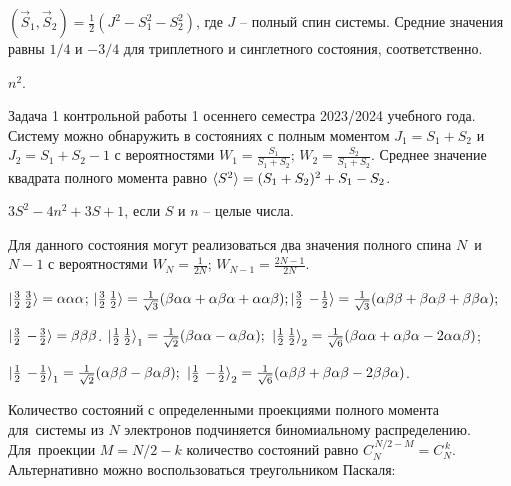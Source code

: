 \par
{} $(\vec{S}_1,\vec{S}_2)=\frac{1}{2}( J^2 - S_1^2-S_2^2)$, где $J$ – полный спин системы. Средние значения равны $1/4$ и $-3/4$ для триплетного и синглетного состояния, соответственно.\par
{} $n^2.$\par
{} Задача 1 контрольной работы 1 осеннего семестра 2023/2024 учебного года. Систему можно обнаружить в состояниях с полным моментом $J_1=S_1+S_2$ и $J_2=S_1+S_2-1$ с вероятностями $W_1=\frac{S_1}{S_1+S_2}$; $W_2=\frac{S_2}{S_1+S_2}$. Среднее значение квадрата полного момента равно $\braket{S^2}=(S_1+S_2 )^2+S_1-S_2$.
\par
{} $3S^2-4n^2+3S+1$, если $S$ и $n$ – целые числа.\par
{} Для данного состояния могут реализоваться два значения полного спина $N$~и $N-1$ с вероятностями $W_{N}=\frac{1}{2N}$; $W_{N-1}=\frac{2N-1}{2N}$.\par
{} $\ket{\frac{3}{2}\,\frac{3}{2}}=\alpha\alpha\alpha$;\hspace{\fill}
$\ket{\frac{3}{2}\,\frac{1}{2}}=\frac{1}{\sqrt3}( \beta\alpha\alpha+\alpha\beta\alpha +\alpha\alpha\beta);$\hspace{\fill}$\ket{\frac{3}{2}\,-\!\frac{1}{2}}=\frac{1}{\sqrt3}( \alpha\beta\beta +\beta\alpha\beta +\beta\beta\alpha);$\par
\vspace{-\parskip+1mm}
$\ket{\frac{3}{2}\,-\!\frac{3}{2}}=\beta\beta\beta$. \hspace{\fill} $\ket{\frac{1}{2}\,\frac{1}{2}}_1 = \frac{1}{\sqrt2}( \beta\alpha\alpha-\alpha\beta\alpha);$ \hspace{\fill} $\ket{\frac{1}{2}\,\frac{1}{2}}_2 = \frac{1}{\sqrt6}( \beta\alpha\alpha+\alpha\beta\alpha -2\alpha\alpha\beta)$;\par
\vspace{-\parskip+1mm}
$\ket{\frac{1}{2}\,-\!\frac{1}{2}}_1 = \frac{1}{\sqrt2}( \alpha\beta\beta-\beta\alpha\beta);$ \quad $\ket{\frac{1}{2}\,-\!\frac{1}{2}}_2 = \frac{1}{\sqrt6}( \alpha\beta\beta+\beta\alpha\beta -2\beta\beta\alpha)$.
\par
{} Количество состояний с определенными проекциями полного момента для~системы из $N$ электронов подчиняется биномиальному распределению. Для~проекции $M =N/2-k$ количество состояний равно $C_{N}^{\,N/2-M}=C_{N}^{\,k}$. Альтернативно можно воспользоваться треугольником Паскаля:\par
\vspace{0.7mm}
